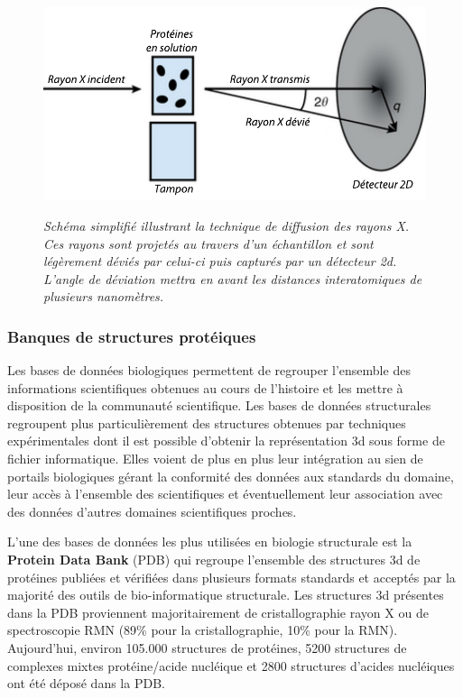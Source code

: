 \begin{figure}
  \centering
  {\includegraphics[width=0.75\linewidth]{./figures/ch1/saxs.pdf}}
    \caption{\it Schéma simplifié illustrant la technique de diffusion des rayons X. Ces rayons sont projetés au travers d'un échantillon et sont légèrement déviés par celui-ci puis capturés par un détecteur 2d. L'angle de déviation mettra en avant les distances interatomiques de plusieurs nanomètres.}
    \label{Fig:saxs}
  \hspace{0.2cm}
\end{figure}


\subsubsection{Banques de structures protéiques} \label{protein_DB}

Les bases de données biologiques permettent de regrouper l'ensemble des informations scientifiques obtenues au cours de l'histoire et les mettre à disposition de la communauté scientifique. Les bases de données structurales regroupent plus particulièrement des structures obtenues par techniques expérimentales dont il est possible d'obtenir la représentation 3d sous forme de fichier informatique. 
Elles voient de plus en plus leur intégration au sien de portails biologiques gérant la conformité des données aux standards du domaine, leur accès à l'ensemble des scientifiques et éventuellement leur association avec des données d'autres domaines scientifiques proches.

L'une des bases de données les plus utilisées en biologie structurale est la \textbf{Protein Data Bank} (PDB) \cite{berman_protein_2000} qui regroupe l'ensemble des structures 3d de protéines publiées et vérifiées dans plusieurs formats standards et acceptés par la majorité des outils de bio-informatique structurale. Les structures 3d présentes dans la PDB proviennent majoritairement de cristallographie rayon X ou de spectroscopie RMN (89\% pour la cristallographie, 10\% pour la RMN). Aujourd'hui, environ 105.000 structures de protéines, 5200 structures de complexes mixtes protéine/acide nucléique et 2800 structures d'acides nucléiques ont été déposé dans la PDB.

